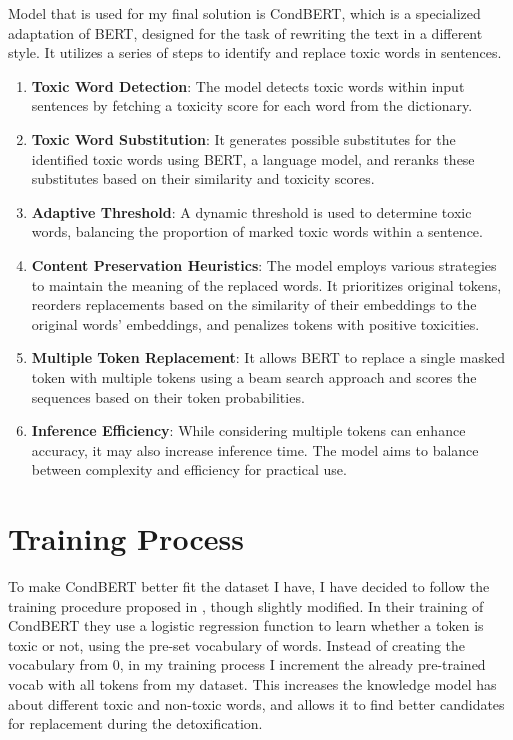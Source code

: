 \documentclass[]{article}
\begin{document}
	Model that is used for my final solution is CondBERT, which is a specialized adaptation of BERT, designed for the task of rewriting the text in a different style. It utilizes a series of steps to identify and replace toxic words in sentences.
	\begin{enumerate}
		\item \textbf{Toxic Word Detection}: The model detects toxic words within input sentences by fetching a toxicity score for each word from the dictionary.
		\item \textbf{Toxic Word Substitution}: It generates possible substitutes for the identified toxic words using BERT, a language model, and reranks these substitutes based on their similarity and toxicity scores.
		\item \textbf{Adaptive Threshold}: A dynamic threshold is used to determine toxic words, balancing the proportion of marked toxic words within a sentence.
		\item \textbf{Content Preservation Heuristics}: The model employs various strategies to maintain the meaning of the replaced words. It prioritizes original tokens, reorders replacements based on the similarity of their embeddings to the original words' embeddings, and penalizes tokens with positive toxicities.
		\item \textbf{Multiple Token Replacement}: It allows BERT to replace a single masked token with multiple tokens using a beam search approach and scores the sequences based on their token probabilities.
		\item \textbf{Inference Efficiency}: While considering multiple tokens can enhance accuracy, it may also increase inference time. The model aims to balance between complexity and efficiency for practical use.
		
	\end{enumerate}
	
	\section{Training Process}
	
	To make CondBERT better fit the dataset I have, I have decided to follow the training procedure proposed in \cite{main}, though slightly modified. In their training of CondBERT they use a logistic regression function to learn whether a token is toxic or not, using the pre-set vocabulary of words. Instead of creating the vocabulary from 0, in my training process I increment the already pre-trained vocab with all tokens from my dataset. This increases the knowledge model has about different toxic and non-toxic words, and allows it to find better candidates for replacement during the detoxification. \\
	
\end{document}

